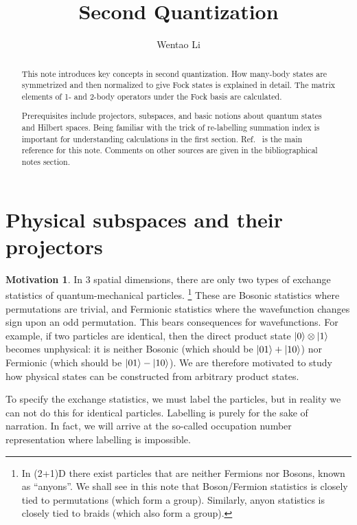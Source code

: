 \documentclass{article}
\author{Wentao Li}
\theoremstyle{definition}
\newtheorem{mot}{Motivation}[section]
\numberwithin{equation}{section}
\begin{document}
    
\title{Second Quantization}

\maketitle

\begin{abstract}
    This note introduces key concepts in second quantization. 
    How many-body states are symmetrized and then normalized 
    to give Fock states is explained in detail. 
    The matrix elements of 1- and 2-body operators 
    under the Fock basis are calculated. 

    Prerequisites include projectors, subspaces, and 
    basic notions about quantum states and Hilbert spaces.
    Being familiar with the trick of re-labelling
    summation index is important for understanding
    calculations in the first section.
    Ref.~\cite[][\S 1.2]{dupuis_field_2023} 
    is the main reference for this note. 
    Comments on other sources are given in the bibliographical notes section. 
\end{abstract}

\tableofcontents
\section{Physical subspaces and their projectors}
\begin{mot}
In 3 spatial dimensions, there are only two types of 
exchange statistics of quantum-mechanical particles. 
\footnote{
In (2+1)D there exist particles that are neither 
Fermions nor Bosons, known as ``anyons''. We shall see 
in this note that Boson/Fermion statistics is closely tied 
to permutations (which form a group). 
Similarly, anyon statistics is closely tied to braids (which also form a group).
}
These are Bosonic statistics where permutations are trivial, 
and Fermionic statistics where the wavefunction changes sign 
upon an odd permutation. 
This bears consequences for wavefunctions. 
For example, if two particles are identical, 
then the direct product state $\ket{0}\otimes \ket{1}$ becomes 
unphysical: it is neither Bosonic 
(which should be $\ket{01}+\ket{10}$) 
nor Fermionic 
(which should be $\ket{01}-\ket{10}$). 
We are therefore motivated to study how physical 
states can be constructed from arbitrary product states.
\end{mot}

To specify the 
exchange statistics, we must label the particles, but in reality 
we can not do this for identical particles. 
Labelling is purely for the sake of narration. In fact, 
we will arrive at the so-called occupation number representation 
where labelling is impossible.
\end{document}
